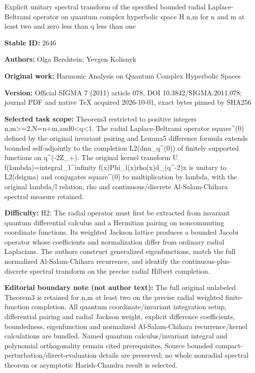 \documentclass[11pt]{article}
\begin{document}
\begin{center}\Large Explicit unitary spectral transform of the specified bounded radial Laplace-Beltrami operator on quantum complex hyperbolic space H n,m for n and m at least two and zero less than q less than one\end{center}
\noindent\textbf{Stable ID:} 2646\par
\noindent\textbf{Authors:} Olga Bershtein; Yevgen Kolisnyk\par
\noindent\textbf{Original work:} Harmonic Analysis on Quantum Complex Hyperbolic Spaces\par
\noindent\textbf{Version:} Official SIGMA 7 (2011) article 078, DOI 10.3842/SIGMA.2011.078; journal PDF and native TeX acquired 2026-10-01, exact bytes pinned by SHA256\par
\noindent\textbf{Selected task scope:} Theorem3 restricted to positive integers n,m>=\allowbreak{}2,N=\allowbreak{}n+\allowbreak{}m,and0<q<1. The radial Laplace-Beltrami operator square\textasciicircum{}(0) defined by the original invariant pairing and Lemma5 difference formula extends bounded self-adjointly to the completion L2(dnu\_q\textasciicircum{}(0)) of finitely supported functions on q\textasciicircum{}(-2Z\_+\allowbreak{}). The original kernel transform U f(lambda)=\allowbreak{}integral\_1\textasciicircum{}infinity f(x)Phi\_l(x)rho(x)d\_(q\textasciicircum{}-2)x is unitary to L2(dsigma) and conjugates square\textasciicircum{}(0) to multiplication by lambda, with the original lambda/l relation, rho and continuous/discrete Al-Salam-Chihara spectral measure retained.\par
\noindent\textbf{Difficulty:} H2: The radial operator must first be extracted from invariant quantum differential calculus and a Hermitian pairing on noncommuting coordinate functions. Its weighted Jackson lattice produces a bounded Jacobi operator whose coefficients and normalization differ from ordinary radial Laplacians. The authors construct generalized eigenfunctions, match the full normalized Al-Salam-Chihara recurrence, and identify the continuous-plus-discrete spectral transform on the precise radial Hilbert completion.\par
\noindent\textbf{Editorial boundary note (not author text):} The full original unlabeled Theorem3 is retained for n,m at least two on the precise radial weighted finite-function completion. All quantum coordinate/invariant integration setup, differential pairing and radial Jackson weight, explicit difference coefficients, boundedness, eigenfunction and normalized Al-Salam-Chihara recurrence/kernel calculations are bundled. Named quantum calculus/invariant integral and polynomial orthogonality remain cited prerequisites. Source bounded compact-perturbation/direct-evaluation details are preserved; no whole nonradial spectral theorem or asymptotic Harish-Chandra result is selected.\par
\end{document}

